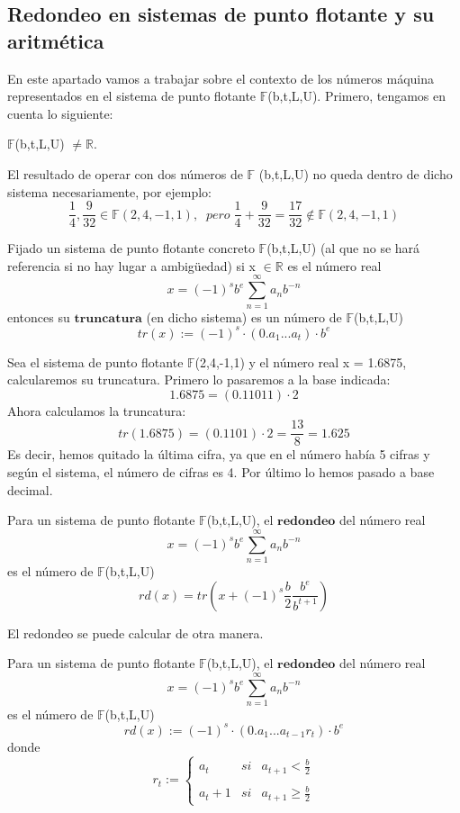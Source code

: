 \subsection{Redondeo en sistemas de punto flotante y su aritmética}
En este apartado vamos a trabajar sobre el contexto de los números máquina representados en el sistema de punto flotante $\mathbb{F}$(b,t,L,U). Primero, tengamos en cuenta lo siguiente:
	\begin{nlist}
	\item $\mathbb{F}$(b,t,L,U) $\neq \mathbb{R}$.
	\item El resultado de operar con dos números de $\mathbb{F}$ (b,t,L,U) no queda dentro de dicho sistema necesariamente, por ejemplo:
	\[ \frac{1}{4}, \frac{9}{32} \in \mathbb{F} (2,4,-1,1), \; \; pero \; \frac{1}{4} + \frac{9}{32} = \frac{17}{32} \notin \mathbb{F} (2,4,-1,1) \]
	\end{nlist}

\begin{ndef}[Truncatura]
Fijado un sistema de punto flotante concreto $\mathbb{F}$(b,t,L,U) (al que no se hará referencia si no hay lugar a ambigüedad) si x $\in \mathbb{R}$ es el número real 
\[ x =(-1)^sb^e \sum_{n=1}^{\infty} a_nb^{-n} \]
entonces su $\textbf{truncatura}$ (en dicho sistema) es un número de $\mathbb{F}$(b,t,L,U)
\[ tr(x) := (-1)^s \cdot (0.a_1...a_t) \cdot b^e \]
\end{ndef}

\begin{ejemplo}
Sea el sistema de punto flotante $\mathbb{F}$(2,4,-1,1) y el número real x = 1.6875, calcularemos su truncatura. Primero lo pasaremos a la base indicada:
\[ 1.6875 = (0.11011) \cdot 2 \]
Ahora calculamos la truncatura:
\[ tr(1.6875) = (0.1101) \cdot 2 = \frac{13}{8} = 1.625 \]
Es decir, hemos quitado la última cifra, ya que en el número había 5 cifras y según el sistema, el número de cifras es 4. Por último lo hemos pasado a base decimal.
\end{ejemplo}

\begin{ndef}
Para un sistema de punto flotante  $\mathbb{F}$(b,t,L,U), el $\textbf{redondeo}$ del número real
\[ x = (-1)^sb^e \sum_{n=1}^{\infty} a_nb^{-n} \]
es el número de $\mathbb{F}$(b,t,L,U)
\[ rd(x) = tr \left( x + (-1)^s \frac{b}{2} \frac{b^e}{b^{t+1}} \right) \]
\end{ndef}

El redondeo se puede calcular de otra manera.

\begin{nprop}
Para un sistema de punto flotante  $\mathbb{F}$(b,t,L,U), el $\textbf{redondeo}$ del número real
\[ x = (-1)^sb^e \sum_{n=1}^{\infty} a_nb^{-n} \]
es el número de $\mathbb{F}$(b,t,L,U)
\[ rd(x) := (-1)^s \cdot (0.a_1...a_{t-1}r_t) \cdot b^e \]
donde
\[ r_t := \left\{ \begin{array}{lcc}
a_t & si & a_{t+1} < \frac{b}{2}\\
\\ a_t +1 & si & a_{t+1} \geq \frac{b}{2}
\end{array} 
\right. \]
\end{nprop}

